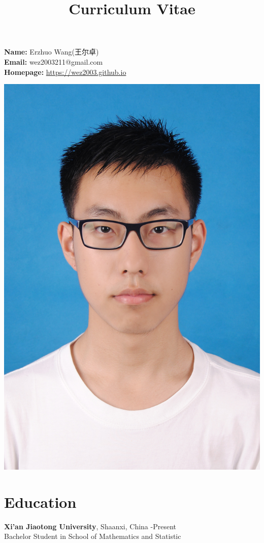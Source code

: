 \documentclass[a4paper,12pt]{article}
\title{Curriculum Vitae}
\date{}
\author{}
\begin{document}
\maketitle
\begin{minipage}{0.65\textwidth}
    \noindent\textbf{Name:} Erzhuo Wang(王尔卓) \\
    \textbf{Email:} wez2003211@gmail.com\\
    \textbf{Homepage:} \url{https://wez2003.github.io}
\end{minipage}
\begin{minipage}{0.13\textwidth}
    \includegraphics[width=\textwidth]{blue.jpg}
\end{minipage}
\section{Education}
\textbf{Xi'an Jiaotong University}, Shaanxi, China -Present  \\
Bachelor Student in School of Mathematics and Statistic  \\
\end{document}
